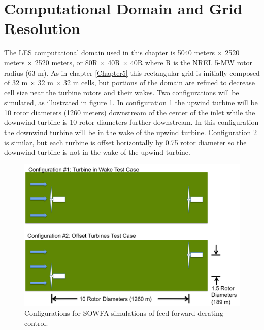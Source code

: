 
\section{Computational Domain and Grid Resolution} \label{section6-3}

The LES computational domain used in this chapter is 5040 meters $\times$ 2520 meters $\times$ 2520 meters, or 80R $\times$ 40R $\times$ 40R where R is the NREL 5-MW rotor radius (63 m). As in chapter \ref{Chapter5} this rectangular grid is initially composed of 32 m $\times$ 32 m $\times$ 32 m cells, but portions of the domain are refined to decrease cell size near the turbine rotors and their wakes. Two configurations will be simulated, as illustrated in figure \ref{fig6-1}. In configuration 1 the upwind turbine will be 10 rotor diameters (1260 meters) downstream of the center of the inlet while the downwind turbine is 10 rotor diameters further downstream. In this configuration the downwind turbine will be in the wake of the upwind turbine. Configuration 2 is similar, but each turbine is offset horizontally by 0.75 rotor diameter so the downwind turbine is not in the wake of the upwind turbine. 

\begin{figure}[ht]	
	\centering
		\includegraphics[width = \linewidth]{Figures/ch6Figures/fig6-1.png}
		
	\caption{Configurations for SOWFA simulations of feed forward derating control.}
	\label{fig6-1}
\end{figure}


